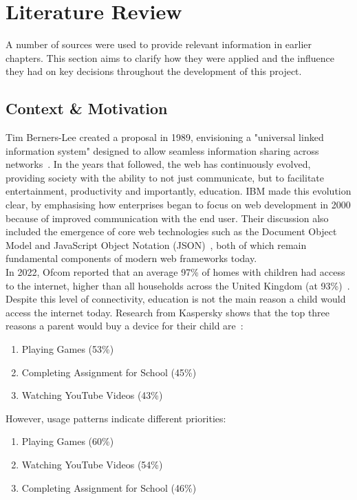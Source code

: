 \documentclass[]{final_report}
\begin{document}
\chapter{Literature Review}

A number of sources were used to provide relevant information in earlier chapters. This section aims to clarify how they were applied and the influence they had on key decisions throughout the development of this project.

\section{Context \& Motivation}

Tim Berners-Lee created a proposal in 1989, envisioning a "universal linked information system" designed to allow seamless information sharing across networks~\cite{TBL_WWW}. In the years that followed, the web has continuously evolved, providing society with the ability to not just communicate, but to facilitate entertainment, productivity and importantly, education. IBM made this evolution clear, by emphasising how enterprises began to focus on web development in 2000 because of improved communication with the end user. Their discussion also included the emergence of core web technologies such as the Document Object Model and JavaScript Object Notation (JSON)~\cite{MODERN_WEB}, both of which remain fundamental components of modern web frameworks today.\\

In 2022, Ofcom reported that an average 97\% of homes with children had access to the internet, higher than all households across the United Kingdom (at 93\%)~\cite{INTERNET_USERS}. Despite this level of connectivity, education is not the main reason a child would access the internet today. Research from Kaspersky shows that the top three reasons a parent would buy a device for their child are~\cite{DEVICE_REPORT}: 

\begin{enumerate}
	\item Playing Games (53\%)
	\item Completing Assignment for School (45\%)
	\item Watching YouTube Videos (43\%)
\end{enumerate}
However, usage patterns indicate different priorities:
\begin{enumerate}
	\item Playing Games (60\%)
	\item Watching YouTube Videos (54\%)
	\item Completing Assignment for School (46\%)
\end{enumerate}
\end{document}
